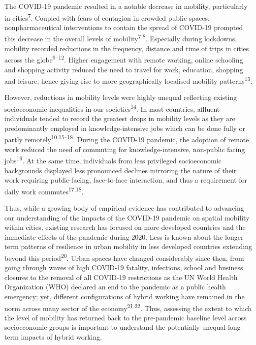\documentclass[
  11pt,
]{article}
\begin{document}
The COVID-19 pandemic resulted in a notable decrease in mobility,
particularly in cities\textsuperscript{7}. Coupled with fears of
contagion in crowded public spaces, nonpharmaceutical interventions to
contain the spread of COVID‐19 prompted this decrease in the overall
levels of mobility\textsuperscript{7,8}. Especially during lockdowns,
mobility recorded reductions in the frequency, distance and time of
trips in cities across the globe\textsuperscript{9--12}. Higher
engagement with remote working, online schooling and shopping activity
reduced the need to travel for work, education, shopping and leisure,
hence giving rise to more geographically localised mobility
patterns\textsuperscript{13}.

However, reductions in mobility levels were highly unequal reflecting
existing socioeconomic inequalities in our
societies\textsuperscript{14}. In most countries, affluent individuals
tended to record the greatest drops in mobility levels as they are
predominantly employed in knowledge-intensive jobs which can be done
fully or partly remotely\textsuperscript{10,15--18}. During the COVID-19
pandemic, the adoption of remote work reduced the need of commuting for
knowledge-intensive, non-public facing jobs\textsuperscript{19}. At the
same time, individuals from less privileged socioeconomic backgrounds
displayed less pronounced declines mirroring the nature of their work
requiring public-facing, face-to-face interaction, and thus a
requirement for daily work commutes\textsuperscript{17,18}.

Thus, while a growing body of empirical evidence has contributed to
advancing our understanding of the impacts of the COVID-19 pandemic on
spatial mobility within cities, existing research has focused on more
developed countries and the immediate effects of the pandemic during
2020. Less is known about the longer term patterns of resilience in
urban mobility in less developed countries extending beyond this
period\textsuperscript{20}. Urban spaces have changed considerably since
then, from going through waves of high COVID-19 fatality, infections,
school and business closures to the removal of all COVID-19 restrictions
as the UN World Health Organization (WHO) declared an end to the
pandemic as a public health emergency; yet, different configurations of
hybrid working have remained in the norm across many sector of the
economy\textsuperscript{21,22}. Thus, assessing the extent to which the
level of mobility has returned back to the pre-pandemic baseline level
across socioeconomic groups is important to understand the potentially
unequal long-term impacts of hybrid working.
\end{document}
